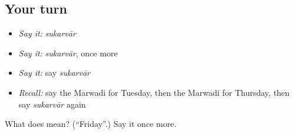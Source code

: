 \subsection*{Your turn}
\begin{itemize}
\raggedright
  \item \emph{Say it:} \emph{sukarvār}
  \item \emph{Say it:} \emph{sukarvār}, once more
  \item \emph{Say it:} say \emph{sukarvār}
  \item \emph{Recall:} say the Marwadi for Tuesday, then the Marwadi for Thursday, then say \emph{sukarvār} again
\end{itemize}

\begin{tcolorbox}[breakable,colback=teal!4,colframe=teal!35!black,title={Before you move on}]
What does  mean? (\textquotedblleft{}Friday\textquotedblright{}.) Say it once more.
\end{tcolorbox}
